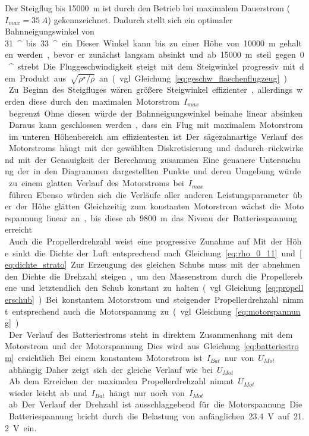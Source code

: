 Der Steigflug bis \SI{15000}{m} ist durch den Betrieb bei maximalem Dauerstrom (\ensuremath{I_{max} = \SI{35}{A}}) gekennzeichnet. Dadurch stellt sich ein optimaler Bahnneigungswinkel von \SI{31}{^\circ} bis \SI{33}{^\circ} ein. Dieser Winkel kann bis zu einer Höhe von \SI{10000}{m} gehalten werden, bevor er zunächst langsam absinkt und ab \SI{15000}{m} steil gegen \SI{0}{^\circ} strebt. Die Fluggeschwindigkeit steigt mit dem Steigwinkel progressiv mit dem Produkt aus \ensuremath{\sqrt{\rho^\star/\rho}} an (vgl. Gleichung \eqref{eq:geschw_flaechenflugzeug}). \\
Zu Beginn des Steigfluges wären größere Steigwinkel effizienter, allerdings werden diese durch den maximalen Motorstrom \ensuremath{I_{max}} begrenzt. Ohne diesen würde der Bahnneigungswinkel beinahe linear absinken. Daraus kann geschlossen werden, dass ein Flug mit maximalem Motorstrom im unteren Höhenbereich am effizientesten ist. Der sägezahnartige Verlauf des Motorstroms hängt mit der gewählten Diskretisierung und dadurch rückwirkend mit der Genauigkeit der Berechnung zusammen. Eine genauere Untersuchung der in den Diagrammen dargestellten Punkte und deren Umgebung würde zu einem glatten Verlauf des Motorstroms bei \ensuremath{I_{max}} führen. Ebenso würden sich die Verläufe aller anderen Leistungsparameter über der Höhe glätten. Gleichzeitig zum konstanten Motorstrom wächst die Motorspannung linear an, bis diese ab \SI{9800}{m} das Niveau der Batteriespannung erreicht. \\
Auch die Propellerdrehzahl weist eine progressive Zunahme auf. Mit der Höhe sinkt die Dichte der Luft entsprechend nach Gleichung \eqref{eq:rho_0_11} und \eqref{eq:dichte_strato}. Zur Erzeugung des gleichen Schubs muss mit der abnehmenden Dichte die Drehzahl steigen, um den Massenstrom durch die Propellerebene und letztendlich den Schub konstant zu halten (vgl. Gleichung \eqref{eq:propellerschub}). Bei konstantem Motorstrom und steigender Propellerdrehzahl nimmt entsprechend auch die Motorspannung zu (vgl. Gleichung \eqref{eq:motorspannung}). \\
Der Verlauf des Batteriestroms steht in direktem Zusammenhang mit dem Motorstrom und der Motorspannung. Dies wird aus Gleichung \eqref{eq:batteriestrom} ersichtlich. Bei einem konstantem Motorstrom ist  \ensuremath{I_{Bat}} nur von \ensuremath{U_{Mot}} abhängig. Daher zeigt sich der gleiche Verlauf wie bei \ensuremath{U_{Mot}}. Ab dem Erreichen der maximalen Propellerdrehzahl nimmt \ensuremath{U_{Mot}} wieder leicht ab und \ensuremath{I_{Bat}} hängt nur noch von \ensuremath{I_{Mot}} ab. Der Verlauf der Drehzahl ist ausschlaggebend für die Motorspannung. Die Batteriespannung bricht durch die Belastung von anfänglichen \SI{23,4}{V} auf \SI{21,2}{V} ein. 
